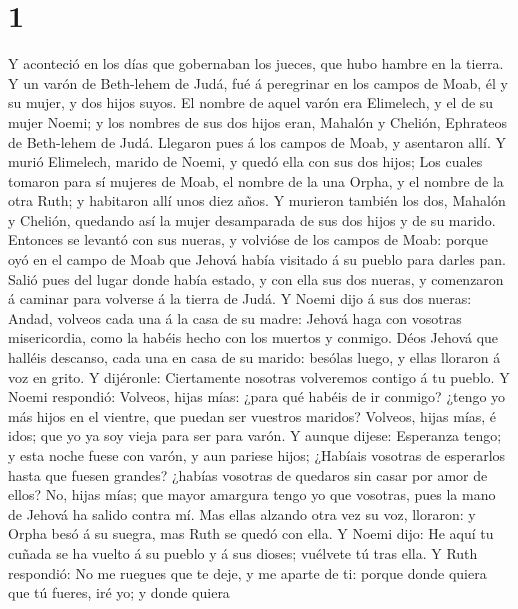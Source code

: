 \hypertarget{section}{%
\section{1}\label{section}}

 Y aconteció en los días que gobernaban los jueces, que hubo
hambre en la tierra. Y un varón de Beth-lehem de Judá, fué á peregrinar
en los campos de Moab, él y su mujer, y dos hijos suyos.  El
nombre de aquel varón era Elimelech, y el de su mujer Noemi; y los
nombres de sus dos hijos eran, Mahalón y Chelión, Ephrateos de
Beth-lehem de Judá. Llegaron pues á los campos de Moab, y asentaron
allí.  Y murió Elimelech, marido de Noemi, y quedó ella con
sus dos hijos;  Los cuales tomaron para sí mujeres de Moab,
el nombre de la una Orpha, y el nombre de la otra Ruth; y habitaron allí
unos diez años.  Y murieron también los dos, Mahalón y
Chelión, quedando así la mujer desamparada de sus dos hijos y de su
marido.  Entonces se levantó con sus nueras, y volvióse de
los campos de Moab: porque oyó en el campo de Moab que Jehová había
visitado á su pueblo para darles pan.  Salió pues del lugar
donde había estado, y con ella sus dos nueras, y comenzaron á caminar
para volverse á la tierra de Judá.  Y Noemi dijo á sus dos
nueras: Andad, volveos cada una á la casa de su madre: Jehová haga con
vosotras misericordia, como la habéis hecho con los muertos y conmigo.
 Déos Jehová que halléis descanso, cada una en casa de su
marido: besólas luego, y ellas lloraron á voz en grito.  Y
dijéronle: Ciertamente nosotras volveremos contigo á tu pueblo.
 Y Noemi respondió: Volveos, hijas mías: ¿para qué habéis
de ir conmigo? ¿tengo yo más hijos en el vientre, que puedan ser
vuestros maridos?  Volveos, hijas mías, é idos; que yo ya
soy vieja para ser para varón. Y aunque dijese: Esperanza tengo; y esta
noche fuese con varón, y aun pariese hijos;  ¿Habíais
vosotras de esperarlos hasta que fuesen grandes? ¿habías vosotras de
quedaros sin casar por amor de ellos? No, hijas mías; que mayor amargura
tengo yo que vosotras, pues la mano de Jehová ha salido contra mí.
 Mas ellas alzando otra vez su voz, lloraron: y Orpha besó
á su suegra, mas Ruth se quedó con ella.  Y Noemi dijo: He
aquí tu cuñada se ha vuelto á su pueblo y á sus dioses; vuélvete tú tras
ella.  Y Ruth respondió: No me ruegues que te deje, y me
aparte de ti: porque donde quiera que tú fueres, iré yo; y donde quiera
